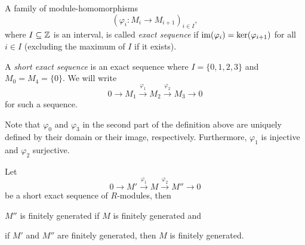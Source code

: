 \begin{defin}
\begin{thmlist}
\item A family of module-homomorphisms
\[(\varphi_i\colon M_i\to M_{i+1})_{i\in I},\]
where $I\subseteq \operatorname{\mathbb{Z}}$ is an interval, is called \emph{exact sequence} if $\operatorname{im}(\varphi_i)=\ker(\varphi_{i+1})$ for all $i\in I$ (excluding the maximum of $I$ if it exists).
\item A \emph{short exact sequence} is an exact sequence where $I=\lbrace0,1,2,3\rbrace$ and $M_0=M_4=\lbrace 0\rbrace$.
We will write
\begin{equation*}
0\longrightarrow M_1\overset{\varphi_1}{\longrightarrow} M_2\overset{\varphi_2}{\longrightarrow} M_3\longrightarrow 0
\end{equation*}
for such  a sequence.
\end{thmlist}
\end{defin}

Note that $\varphi_0$ and $\varphi_3$ in the second part of the definition above are uniquely defined by their domain or their image, respectively. Furthermore, $\varphi_1$ is injective and $\varphi_2$ surjective.

\begin{lem}\label{lem.Short Exact Sequence of Finitely Generated Modules}
Let
\begin{equation*}
0\longrightarrow M'\overset{\varphi_1}{\longrightarrow} M\overset{\varphi_2}{\longrightarrow} M''\longrightarrow 0
\end{equation*}
be a short exact sequence of $R$-modules, then
\begin{thmlist}
\item $M''$ is finitely generated if $M$ is finitely generated and
\item if $M'$ and $M''$ are finitely generated, then $M$ is finitely generated.\label{lem.M' M'' implies M}
\end{thmlist}
\end{lem}

